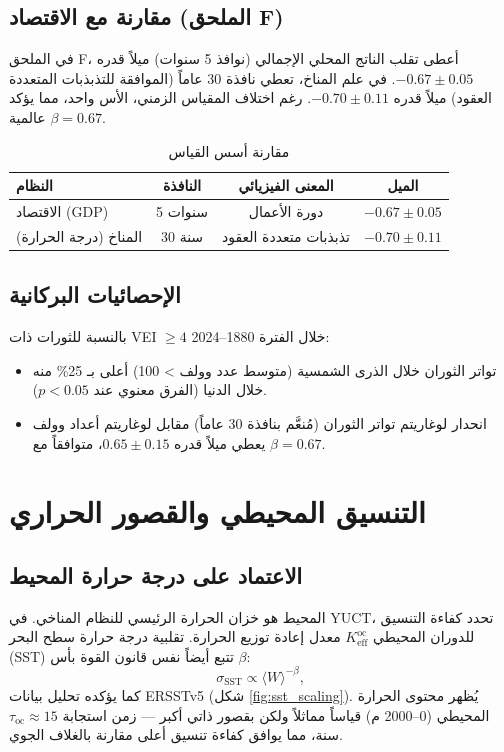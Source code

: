 \documentclass[11pt,a4paper]{article}
\newcommand{\Keff}{K_{\mathrm{eff}}}
\newcommand{\be}{\beta}
\begin{document}
	\subsection{مقارنة مع الاقتصاد (الملحق F)}
	
	في الملحق F، أعطى تقلب الناتج المحلي الإجمالي (نوافذ 5 سنوات) ميلاً قدره \(-0.67 \pm 0.05\). في علم المناخ، تعطي نافذة 30 عاماً (الموافقة للتذبذبات المتعددة العقود) ميلاً قدره \(-0.70 \pm 0.11\). رغم اختلاف المقياس الزمني، الأس واحد، مما يؤكد عالمية \(\be = 0.67\).
	
	\begin{table}[htbp]
		\centering
		\caption{مقارنة أسس القياس}
		\label{tab:compare}
		\begin{tabular}{@{}lccc@{}}
			\toprule
			النظام & النافذة & المعنى الفيزيائي & الميل \\
			\midrule
			الاقتصاد (GDP) & 5 سنوات & دورة الأعمال & \(-0.67 \pm 0.05\) \\
			المناخ (درجة الحرارة) & 30 سنة & تذبذبات متعددة العقود & \(-0.70 \pm 0.11\) \\
			\bottomrule
		\end{tabular}
	\end{table}
	
	\subsection{الإحصائيات البركانية}
	
	بالنسبة للثورات ذات VEI \(\ge 4\) خلال الفترة 1880–2024:
	\begin{itemize}
		\item تواتر الثوران خلال الذرى الشمسية (متوسط عدد وولف > 100) أعلى بـ 25\% منه خلال الدنيا (الفرق معنوي عند \(p < 0.05\)).
		\item انحدار لوغاريتم تواتر الثوران (مُنعَّم بنافذة 30 عاماً) مقابل لوغاريتم أعداد وولف يعطي ميلاً قدره \(0.65 \pm 0.15\)، متوافقاً مع \(\beta = 0.67\).
	\end{itemize}
	
	\section{التنسيق المحيطي والقصور الحراري}
	
	\subsection{الاعتماد على درجة حرارة المحيط}
	
	المحيط هو خزان الحرارة الرئيسي للنظام المناخي. في YUCT، تحدد كفاءة التنسيق للدوران المحيطي \(\Keff^{\text{oc}}\) معدل إعادة توزيع الحرارة. تقلبية درجة حرارة سطح البحر (SST) تتبع أيضاً نفس قانون القوة بأس \(\be\):
	\[
	\sigma_{\text{SST}} \propto \langle W \rangle^{-\be},
	\]
	كما يؤكده تحليل بيانات ERSSTv5 (شكل \ref{fig:sst_scaling}). يُظهر محتوى الحرارة المحيطي (0–2000 م) قياساً مماثلاً ولكن بقصور ذاتي أكبر — زمن استجابة \(\tau_{\text{oc}} \approx 15\) سنة، مما يوافق كفاءة تنسيق أعلى مقارنة بالغلاف الجوي.
	
\end{document}
